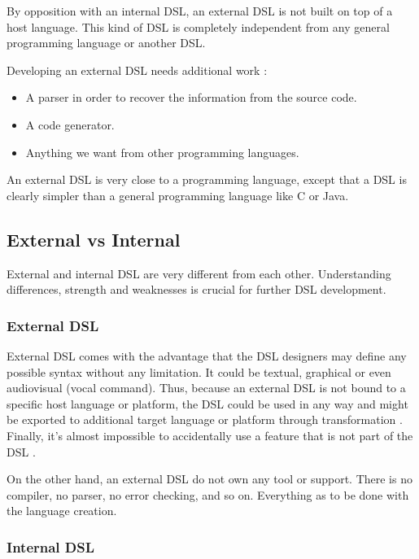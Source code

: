 By opposition with an internal \gls{DSL}, an external \gls{DSL} is not built on
top of a host language. This kind of \gls{DSL} is completely independent from
any general programming language or another \gls{DSL}.

Developing an external \gls{DSL} needs additional work :
\begin{itemize}
\item A parser in order to recover the information from the source code.
\item A code generator.
\item Anything we want from other programming languages.
\end{itemize}

An external \gls{DSL} is very close to a programming language, except that a
\gls{DSL} is clearly simpler than a general programming language like C or Java.

\subsection{External vs Internal}
\label{sec:external_vs_internal}

External and internal \gls{DSL} are very different from each other. 
Understanding differences, strength and weaknesses is crucial for
further \gls{DSL} development.

\subsubsection{External \gls{DSL}}
\label{subsubsec:external_dsl}

External \gls{DSL} comes with the advantage that the \gls{DSL} designers may
define any possible syntax without any limitation\cite{strembeckmarkzdunuwe2009}. It could be textual,
graphical or even audiovisual (vocal command). Thus, because an external
\gls{DSL} is not bound to a specific host language or platform, the \gls{DSL}
could be used in any way and might be exported to additional target language or
platform through transformation \cite{strembeckmarkzdunuwe2009}. Finally, it's
almost impossible to accidentally use a feature that is not part of the \gls{DSL}
\cite{strembeckmarkzdunuwe2009}.

On the other hand, an external \gls{DSL} do not own any tool or support. There
is no compiler, no parser, no error checking, and so on. Everything as to be done
with the language creation.

\subsubsection{Internal \gls{DSL}}
\label{subsubsec:internal_dsl}


